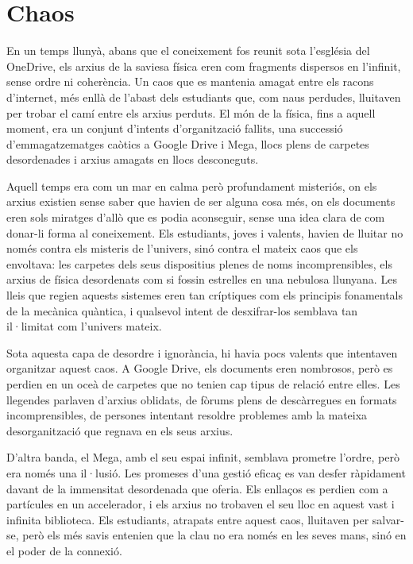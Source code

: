 \chapter{Chaos}


\lettrine[loversize=0.2, lines=2]{E}{}n un temps llunyà, abans que el coneixement fos reunit sota l’església del OneDrive, els arxius de la saviesa física eren com fragments dispersos en l’infinit, sense ordre ni coherència. Un caos que es mantenia amagat entre els racons d'internet, més enllà de l'abast dels estudiants que, com naus perdudes, lluitaven per trobar el camí entre els arxius perduts. El món de la física, fins a aquell moment, era un conjunt d’intents d'organització fallits, una successió d’emmagatze\-matges caòtics a Google Drive i Mega, llocs plens de carpetes desordenades i arxius amagats en llocs desconeguts.

Aquell temps era com un mar en calma però profundament misteriós, on els arxius existien sense saber que havien de ser alguna cosa més, on els documents eren sols miratges d’allò que es podia aconseguir, sense una idea clara de com donar-li forma al coneixement. Els estudiants, joves i valents, havien de lluitar no només contra els misteris de l'univers, sinó contra el mateix caos que els envoltava: les carpetes dels seus dispositius plenes de noms incomprensibles, els arxius de física desordenats com si fossin estrelles en una nebulosa llunyana. Les lleis que regien aquests sistemes eren tan críptiques com els principis fonamentals de la mecànica quàntica, i qualsevol intent de desxifrar-los semblava tan il·limitat com l’univers mateix.

Sota aquesta capa de desordre i ignorància, hi havia pocs valents que intentaven organitzar aquest caos. A Google Drive, els documents eren nombrosos, però es perdien en un oceà de carpetes que no tenien cap tipus de relació entre elles. Les llegendes parlaven d’arxius oblidats, de fòrums plens de descàrregues en formats incomprensibles, de persones intentant resoldre problemes amb la mateixa desorganització que regnava en els seus arxius.

D’altra banda, el Mega, amb el seu espai infinit, semblava prometre l’ordre, però era només una il·lusió. Les promeses d'una gestió eficaç es van desfer ràpidament davant de la immensitat desordenada que oferia. Els enllaços es perdien com a partícules en un accelerador, i els arxius no trobaven el seu lloc en aquest vast i infinita biblioteca. Els estudiants, atrapats entre aquest caos, lluitaven per salvar-se, però els més savis entenien que la clau no era només en les seves mans, sinó en el poder de la connexió.

